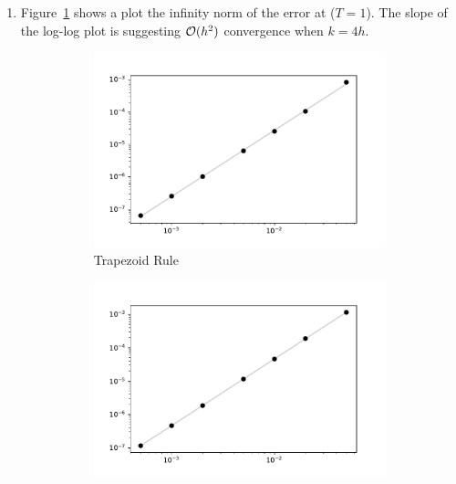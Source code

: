 \documentclass[10pt]{article}
\begin{document}
\begin{solution}[Solution]

\begin{enumerate}[label=(\alph*)]
\item Figure~\ref{trap} shows a plot the infinity norm of the  error at (\( T = 1 \)). The slope of the log-log plot is  suggesting \( \mathcal{O}(h^2) \) convergence when \( k=4h \).

    \begin{figure}[H]\centering
    \begin{subfigure}{.32\textwidth}\centering
        \includegraphics[width=\textwidth]{img/err.pdf}
        \caption{Trapezoid Rule}
        \label{trap}
    \end{subfigure}
    \begin{subfigure}{.32\textwidth}\centering
        \includegraphics[width=\textwidth]{img/err_TRBDF2.pdf}

\end{subfigure}
\end{figure}
\end{enumerate}
\end{solution}
\end{document}
